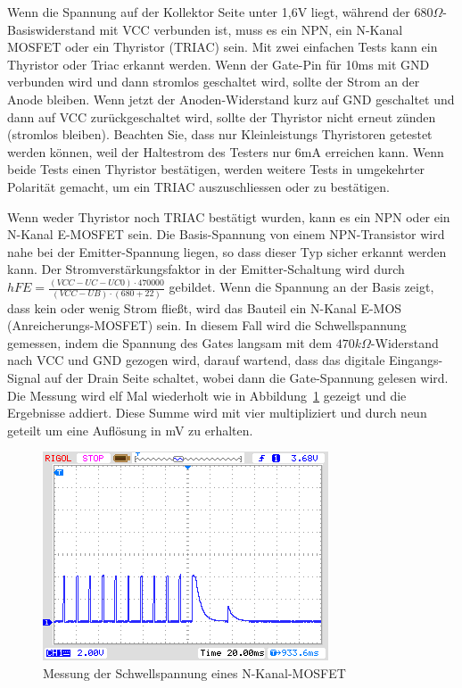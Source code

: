 Wenn die Spannung auf der Kollektor Seite unter 1,6V liegt, während der \(680\Omega\)-Basiswiderstand mit
VCC verbunden ist, muss es ein NPN, ein N-Kanal MOSFET oder ein Thyristor (TRIAC) sein.
Mit zwei einfachen Tests kann ein Thyristor oder Triac erkannt werden.
Wenn der Gate-Pin für 10ms mit GND verbunden wird und dann stromlos geschaltet wird, sollte
der Strom an der Anode bleiben.
Wenn jetzt der Anoden-Widerstand kurz auf GND geschaltet und dann auf VCC zurückgeschaltet wird,
sollte der Thyristor nicht erneut zünden (stromlos bleiben).
Beachten Sie, dass nur Kleinleistungs Thyristoren getestet werden können, weil der Haltestrom des
Testers nur 6mA erreichen kann.
Wenn beide Tests einen Thyristor bestätigen, werden weitere Tests in umgekehrter Polarität gemacht,
um ein TRIAC auszuschliessen oder zu bestätigen.

Wenn weder Thyristor noch TRIAC bestätigt wurden, kann es ein NPN oder ein N-Kanal E-MOSFET sein.
Die Basis-Spannung von einem NPN-Transistor wird nahe bei der Emitter-Spannung liegen, so dass dieser Typ sicher
erkannt werden kann.
Der Stromverstärkungsfaktor in der Emitter-Schaltung wird durch 
\(hFE = \frac{(VCC-UC-UC0)\cdot 470000}{(VCC-UB)\cdot (680+22)}\) gebildet.
Wenn die Spannung an der Basis zeigt, dass kein oder wenig Strom fließt, wird das Bauteil ein N-Kanal E-MOS
(Anreicherungs-MOSFET) sein.
In diesem Fall wird die Schwellspannung gemessen, indem die Spannung des Gates langsam mit
dem \(470k\Omega\)-Widerstand nach VCC und GND gezogen wird, darauf wartend, dass das digitale
Eingangs-Signal auf der Drain Seite schaltet, wobei dann die Gate-Spannung gelesen wird.
Die Messung wird elf Mal wiederholt wie in Abbildung~\ref{fig:eleven} gezeigt und die Ergebnisse addiert.
Diese Summe wird mit vier multipliziert und durch neun geteilt um eine Auflösung in mV zu erhalten.
\begin{figure}[H]
\centering
\includegraphics[]{../PNG/IRFU120gate.png}
\caption{Messung der Schwellspannung eines N-Kanal-MOSFET}
\label{fig:eleven}
\end{figure}

